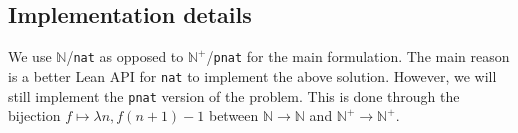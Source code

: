 \documentclass{article}
\newcommand{\N}{\mathbb{N}}
\begin{document}
\subsection*{Implementation details}

We use $\N$/\texttt{nat} as opposed to $\N^+$/\texttt{pnat} for the main formulation.
The main reason is a better Lean API for \texttt{nat} to implement the above solution.
However, we will still implement the \texttt{pnat} version of the problem.
This is done through the bijection $f \mapsto \lambda n, f(n + 1) - 1$ between $\N \to \N$ and $\N^+ \to \N^+$.
\end{document}
